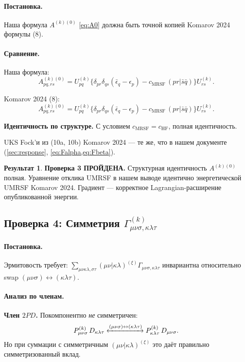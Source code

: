 \documentclass[11pt, a4paper]{article}
\theoremstyle{definition}
\newtheorem*{result}{Результат}
\newcommand{\Uk}[2]{U^{(#1)}_{#2}}
\newcommand{\Akz}{A^{(k)(0)}}
\newcommand{\HF}{\text{HF}}
\newcommand{\MRSF}{\text{MRSF}}
\begin{document}
\paragraph{Постановка.} Наша формула $A^{(k)(0)}$ \eqref{eq:A0} должна быть точной копией Komarov 2024 формулы (8).

\paragraph{Сравнение.}

Наша формула:
$$
\Akz_{pq, rs} = \Uk{k}{pq} \bigl\{ \delta_{pr}\delta_{qs}(\bar\epsilon_q - \epsilon_p) - c_{\MRSF}\, (pr | \bar s \bar q) \bigr\} \Uk{k}{rs}.
$$

Komarov 2024 (8):
$$
A^{(k)(0)}_{pq, rs} = U^{(k)}_{pq} \bigl\{ \delta_{pr}\delta_{qs}(\bar\epsilon_q - \epsilon_p) - c_{\MRSF}\, (pr | \bar s \bar q) \bigr\} U^{(k)}_{rs}.
$$

\textbf{Идентичность по структуре.} С условием $c_{\MRSF} = c_{\HF}$, полная идентичность.

UKS Fock'и из (10a, 10b) Komarov 2024 --- те же, что в нашем документе (\cref{sec:response}, \cref{eq:Falpha,eq:Fbeta}).

\begin{result}
\textbf{Проверка 3 ПРОЙДЕНА.} Структурная идентичность $A^{(k)(0)}$ полная. Уравнение отклика UMRSF в нашем выводе идентично энергетической UMRSF Komarov 2024. Градиент --- корректное Lagrangian-расширение опубликованной энергии.
\end{result}

\subsection{Проверка 4: Симметрия $\Gamma^{(k)}_{\mu\nu\sigma, \kappa\lambda\tau}$}

\paragraph{Постановка.} Эрмитовость требует: $\sum_{\mu\nu\kappa\lambda, \sigma\tau} (\mu\nu | \kappa\lambda)^{(\xi)} \Gamma_{\mu\nu\sigma, \kappa\lambda\tau}$ инвариантна относительно swap $(\mu\nu\sigma) \leftrightarrow (\kappa\lambda\tau)$.

\paragraph{Анализ по членам.}

\textbf{Член $2 P D$.} Покомпонентно \emph{не} симметричен:
$$
P^{(k)}_{\mu\nu\sigma}\, D_{\kappa\lambda\tau} \xleftrightarrow{(\mu\nu\sigma) \leftrightarrow (\kappa\lambda\tau)} P^{(k)}_{\kappa\lambda\tau}\, D_{\mu\nu\sigma}.
$$
Но при суммации с симметричным $(\mu\nu | \kappa\lambda)^{(\xi)}$ это даёт правильно симметризованный вклад. \checkmark
\end{document}
